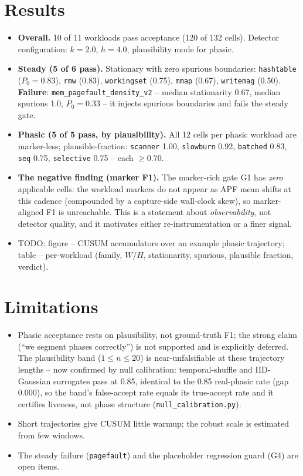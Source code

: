 \documentclass[conference]{IEEEtran}
\begin{document}
\section{Results}
\begin{itemize}
  \item \textbf{Overall.} 10 of 11 workloads pass acceptance
        (120 of 132 cells). Detector configuration: $k=2.0$, $h=4.0$,
        plausibility mode for phasic.
  \item \textbf{Steady (5 of 6 pass).} Stationary with zero spurious boundaries:
        \texttt{hashtable} ($P_0=0.83$), \texttt{rmw} (0.83),
        \texttt{workingset} (0.75), \texttt{mmap} (0.67), \texttt{writemag}
        (0.50). \textbf{Failure}: \texttt{mem\_pagefault\_density\_v2} --
        median stationarity 0.67, median spurious 1.0, $P_0=0.33$ -- it injects
        spurious boundaries and fails the steady gate.
  \item \textbf{Phasic (5 of 5 pass, by plausibility).} All 12 cells per phasic
        workload are marker-less; plausible-fraction:
        \texttt{scanner} 1.00, \texttt{slowburn} 0.92, \texttt{batched} 0.83,
        \texttt{seq} 0.75, \texttt{selective} 0.75 -- each $\ge 0.70$.
  \item \textbf{The negative finding (marker F1).} The marker-rich gate G1 has
        \emph{zero} applicable cells: the workload markers do not appear as APF
        mean shifts at this cadence (compounded by a capture-side wall-clock
        skew), so marker-aligned F1 is unreachable. This is a statement about
        \emph{observability}, not detector quality, and it motivates either
        re-instrumentation or a finer signal.
  \item TODO: figure -- CUSUM accumulators over an example phasic trajectory;
        table -- per-workload (family, $W/H$, stationarity, spurious, plausible
        fraction, verdict).
\end{itemize}

\section{Limitations}
\begin{itemize}
  \item Phasic acceptance rests on plausibility, not ground-truth F1; the
        strong claim (``we segment phases correctly'') is not supported and is
        explicitly deferred. The plausibility band ($1 \le n \le 20$) is
        near-unfalsifiable at these trajectory lengths -- now confirmed by null
        calibration: temporal-shuffle and IID-Gaussian surrogates pass at 0.85,
        identical to the 0.85 real-phasic rate (gap 0.000), so the band's
        false-accept rate equals its true-accept rate and it certifies liveness,
        not phase structure (\texttt{null\_calibration.py}).
  \item Short trajectories give CUSUM little warmup; the robust scale is
        estimated from few windows.
  \item The steady failure (\texttt{pagefault}) and the placeholder regression
        guard (G4) are open items.
\end{itemize}
\end{document}
